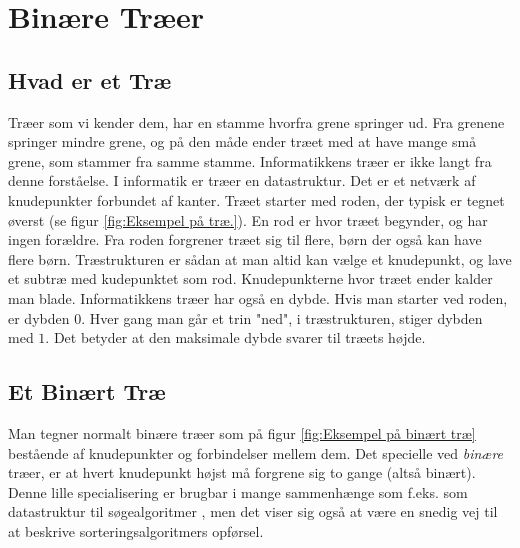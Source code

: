 \chapter{Binære Træer}
\label{ch:Binære Træer}


\section{Hvad er et Træ}
\label{sec:Hvad er et Træ}

Træer som vi kender dem, har en stamme hvorfra grene springer ud. Fra grenene springer mindre grene, og på den måde ender træet med at have mange små grene, som stammer fra samme stamme. Informatikkens træer er ikke langt fra denne forståelse. I informatik er træer en datastruktur. Det er et netværk af knudepunkter forbundet af kanter. Træet starter med roden, der typisk er tegnet øverst (se figur \ref{fig:Eksempel på træ.}). En rod er hvor træet begynder, og har ingen forældre. Fra roden forgrener træet sig til flere, børn der også kan have flere børn. Træstrukturen er sådan at man altid kan vælge et knudepunkt, og lave et subtræ med kudepunktet som rod. Knudepunkterne hvor træet ender kalder man blade. Informatikkens træer har også en dybde. Hvis man starter ved roden, er dybden $0$. Hver gang man går et trin "ned", i træstrukturen, stiger dybden med $1$. Det betyder at den maksimale dybde svarer til træets højde. \cite{trees}


\section{Et Binært Træ}
\label{sec:Et Binært Træ}

Man tegner normalt binære træer som på figur \ref{fig:Eksempel på binært træ} bestående af knudepunkter og forbindelser mellem dem. Det specielle ved \emph{binære} træer, er at hvert knudepunkt højst må forgrene sig to gange (altså binært). Denne lille specialisering er brugbar i mange sammenhænge som f.eks. som datastruktur til søgealgoritmer \cite{BST}, men det viser sig også at være en snedig vej til at beskrive sorteringsalgoritmers opførsel.

